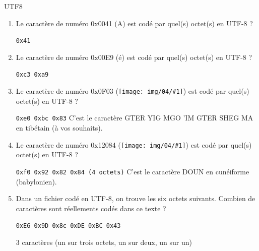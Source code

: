 \begin{exercice}
  \begin{exercicelet}{UTF8}
    \def\pres#1{\textcolor{solarizedRed}{\large #1}}
    \def\presg#1{\texttt{[image: img/04/\#1]}}
    \begin{enumerate}
    \item Le caractère de numéro 0x0041 (\pres{A}) est codé par quel(s)
      octet(s) en UTF-8 ?
      \begin{correction}{\texttt{0x41}}\end{correction}
    \item Le caractère de numéro 0x00E9 (\pres{é}) est codé par quel(s)
      octet(s) en UTF-8 ?
      \begin{correction}{\texttt{0xc3 0xa9}}\end{correction}
    \item Le caractère de numéro 0x0F03 (\presg{U0F03}) est codé par quel(s)
      octet(s) en UTF-8 ?
      \begin{correction}{\texttt{0xe0 0xbc 0x83}} C'est le caractère GTER
        YIG MGO 'IM GTER SHEG MA en tibétain (à vos souhaits).\end{correction}
    \item Le caractère de numéro 0x12084 (\presg{U12084}) est codé par quel(s)
      octet(s) en UTF-8 ?
      \begin{correction}{\texttt{0xf0 0x92 0x82 0x84 (4 octets)}} C'est le
        caractère DOUN en cunéiforme (babylonien).\end{correction}
    \item Dans un fichier codé en UTF-8, on trouve les six octets
      suivants. Combien de caractères sont réellements codés dans ce texte ?
      \centerline{\mbox{\large\texttt{0xE6 0x9D 0x8c 0xDE 0xBC 0x43}}}
      \begin{xcorrection}{3 caractères (un sur trois octets, un sur deux, un
          sur un)

}
\end{xcorrection}
\end{enumerate}
\end{exercicelet}
\end{exercice}
